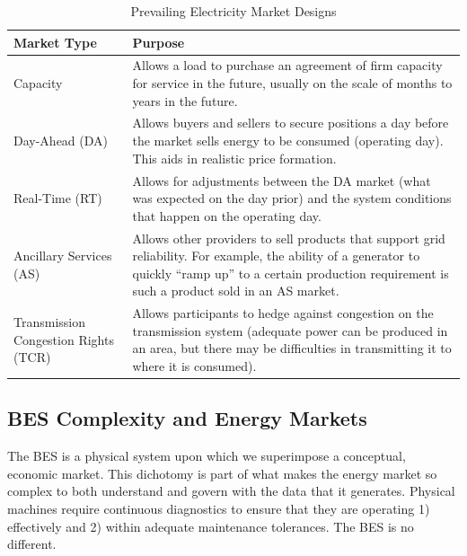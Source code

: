 \begin{table}[ht]
    \centering
    \renewcommand{\arraystretch}{1.2} %
    \begin{tabular}{|p{4.5cm}|p{11cm}|}  %
        \hline
        \textbf{Market Type} & \textbf{Purpose} \\ 
        \hline
        Capacity & Allows a load to purchase an agreement of firm capacity for service in the future, usually on the scale of months to years in the future. \\ 
        \hline
        Day-Ahead (DA) & Allows buyers and sellers to secure positions a day before the market sells energy to be consumed (operating day). This aids in realistic price formation. \\ 
        \hline
        Real-Time (RT) & Allows for adjustments between the DA market (what was expected on the day prior) and the system conditions that happen on the operating day. \\ 
        \hline
        Ancillary Services (AS) & Allows other providers to sell products that support grid reliability. For example, the ability of a generator to quickly “ramp up” to a certain production requirement is such a product sold in an AS market. \\
        \hline
        Transmission Congestion \newline Rights (TCR) & Allows participants to hedge against congestion on the transmission system (adequate power can be produced in an area, but there may be difficulties in transmitting it to where it is consumed). \\
        \hline
    \end{tabular}
    \caption{Prevailing Electricity Market Designs}
    \label{tab:mktdesign}
\end{table}

\subsection{BES Complexity and Energy Markets}

The BES is a physical system upon which we superimpose a conceptual, economic market. This dichotomy is part of what makes the energy market so complex to both understand and govern with the data that it generates. Physical machines require continuous diagnostics to ensure that they are operating 1) effectively and 2) within adequate maintenance tolerances. The BES is no different.

